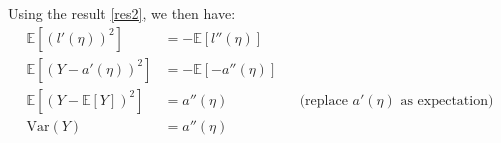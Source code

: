 \begin{answer}
Using the result \eqref{res2}, we then have:
\begin{align}
	\mathbb{E}[(l'(\eta))^2] &= - \mathbb{E}[l''(\eta)] \\
	\mathbb{E}[(Y - a'(\eta))^2] &= - \mathbb{E}[-a''(\eta)] \\
	\mathbb{E}[(Y - \mathbb{E}[Y])^2] &= a''(\eta) && \text{(replace $a'(\eta)$ as expectation)} \\
	\text{Var}(Y) &= a''(\eta)
\end{align} \\
\end{answer}
